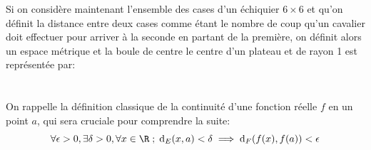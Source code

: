 \subsection*{}
Si on considère maintenant l'ensemble des cases d'un échiquier \(6 \times 6\) et qu'on définit la distance entre deux cases comme étant le nombre de coup qu'un cavalier doit effectuer pour arriver à la seconde en partant de la première, on définit alors un espace métrique et la boule de centre le centre d'un plateau et de rayon 1 est représentée par:
\begin{center}
\end{center}

\chapter*{}
On rappelle la définition classique de la continuité d'une fonction réelle \(f\) en un point \(a\), qui sera cruciale pour comprendre la suite:
\[
   \forall \epsilon > 0 , \exists \delta > 0 , \forall x \in \R \; ; \; \text{d}_E(x, a) < \delta  \implies  \text{d}_F(f(x), f(a)) < \epsilon
\]
